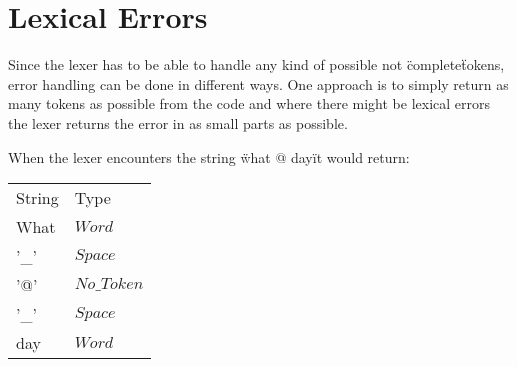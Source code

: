 \section{Lexical Errors}
Since the lexer has to be able to handle any kind of possible not \"complete\"
tokens, error handling can be done in different ways. One approach is to simply
return as many tokens as possible from the code and where there might be lexical
errors the lexer returns the error in as small parts as possible.
\begin{example} When the lexer encounters the
string \"what @ day\" it would return:
\begin{center}
\begin{tabular}{ll}
String & Type\\
What & $Word$\\
'\_' & $Space$\\
'@' & $No\_Token$\\
'\_' & $Space$\\
day & $Word$\\
\end{tabular}
\end{center}
\end{example}

